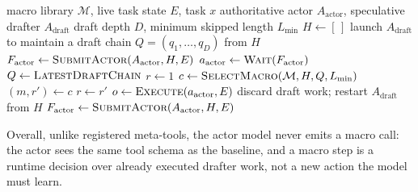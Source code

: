 \begin{algorithm}[t]
\caption{\textsc{Speculative Macro Commit} Executor}
\label{alg:smc-runtime}
\small
\begin{algorithmic}[1]
\Require macro library $\mathcal{M}$, live task state $E$, task $x$
\Require authoritative actor $A_{\mathrm{actor}}$, speculative drafter $A_{\mathrm{draft}}$
\Require draft depth $D$, minimum skipped length $L_{\min}$
\State $H \gets [\,]$ 
\State launch $A_{\mathrm{draft}}$ to maintain a draft chain $Q=(q_1,\ldots,q_D)$ from $H$
\State $F_{\mathrm{actor}} \gets \Call{SubmitActor}{A_{\mathrm{actor}}, H, E}$
    \State $a_{\mathrm{actor}} \gets \Call{Wait}{F_{\mathrm{actor}}}$
    \State $Q \gets \Call{LatestDraftChain}{}$
        \State {}
        \State $r \gets 1$
        \State $c \gets \Call{SelectMacro}{\mathcal{M}, H, Q, L_{\min}}$
            \State $(m,r') \gets c$
                    \State {}
                \EndFor
                \State $r \gets r'$
            \EndIf
        \EndIf
        \State {}
    \Else
        \State $o \gets \Call{Execute}{a_{\mathrm{actor}}, E}$
        \State {}
        \State discard draft work; restart $A_{\mathrm{draft}}$ from $H$
    \EndIf
    \State $F_{\mathrm{actor}} \gets \Call{SubmitActor}{A_{\mathrm{actor}}, H, E}$
\EndWhile
\end{algorithmic}
\end{algorithm}

 
Overall, unlike registered meta-tools, the actor model never emits a macro call: the actor sees the same tool schema as the baseline, and a macro step is a runtime decision over already executed drafter work, not a new action the model must learn. 

